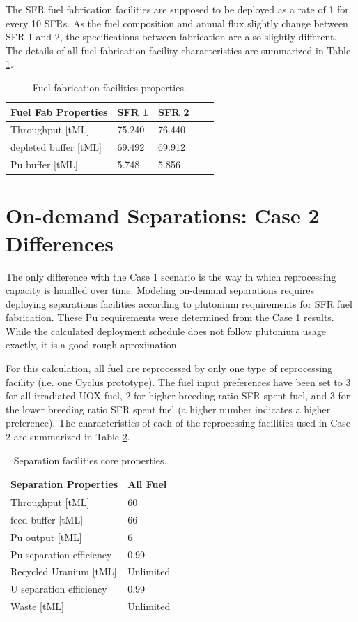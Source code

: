 \documentclass[12pt]{article}
\begin{document}
The SFR fuel fabrication facilities are supposed to be deployed as a rate of 1
for every 10 SFRs.  As the fuel composition and annual flux slightly change
between SFR 1 and 2, the specifications between fabrication are also slightly
different. The details of all fuel fabrication facility characteristics are
summarized in Table \ref{tab:fuelfab_1}.

\begin{table}[h!]
    \centering
    \begin{tabular}{lllll}
    \hline
    Fuel Fab Properties	&	SFR 1	&	SFR 2	\\
    \hline
    Throughput [tML]	&	75.240	&	76.440	\\
    depleted buffer [tML]	&	69.492	&	69.912	\\
    Pu buffer  [tML]		&	5.748	&	5.856	\\
    \hline
    \end{tabular}
    \caption{Fuel fabrication facilities properties.}
    \label{tab:fuelfab_1}
\end{table}

\section{On-demand Separations: Case 2 Differences}
\label{sec:case2}

The only difference with the Case 1 scenario is the way in
which reprocessing capacity is handled over time.  Modeling on-demand
separations requires deploying separations facilities according to plutonium
requirements for SFR fuel fabrication.  These Pu requirements were determined
from the Case 1 results. While the calculated deployment schedule does not
follow plutonium usage exactly, it is a good rough aproximation. 

For this calculation, all fuel are reprocessed by only one type of
reprocessing facility (i.e. one Cyclus prototype). The fuel input preferences
have been set to 3 for all irradiated UOX fuel, 2 for higher breeding ratio
SFR spent fuel, and 3 for the lower breeding ratio SFR spent fuel (a higher
number indicates a higher preference).  The characteristics of each of the
reprocessing facilities used in Case 2 are summarized in Table
\ref{tab:fuelfab_2}.

\begin{table}[h!]
    \centering
    \begin{tabular}{ll}
    \hline
    Separation Properties	&	All Fuel	\\
    \hline
    Throughput [tML]		&	60		\\
    feed buffer [tML]		&	66		\\
    Pu output  [tML]		&	6		\\
    Pu separation efficiency	&	0.99		\\
    Recycled Uranium [tML]	&	Unlimited	\\
    U separation efficiency	&	0.99		\\
    Waste [tML]			&	Unlimited	\\
    \hline
    \end{tabular}
    \caption{Separation facilities core properties.}
    \label{tab:fuelfab_2}
\end{table}
\end{document}
